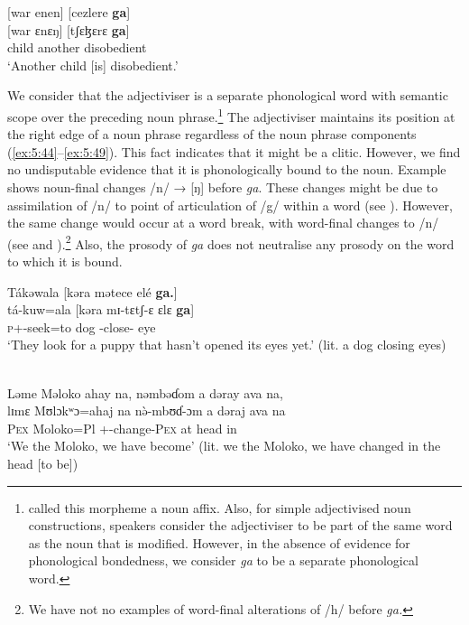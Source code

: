 \ea \label{ex:5:43}
{}[war  enen]  [cezlere  \textbf{ga}]\\
\gll  {}[war  ɛnɛŋ]   [tʃɛɮɛrɛ    \textbf{ga}]\\
      child    another    disobedient    {\ADJ}\\
\glt  ‘Another child [is] disobedient.’
\z

\largerpage
We consider that the adjectiviser is a separate phonological word with semantic scope over the preceding noun phrase.\footnote{\citet{Bow1997c} called this morpheme a noun affix. Also, for simple adjectivised noun constructions, speakers consider the adjectiviser to be part of the same word as the noun that is modified. However, in the absence of evidence for phonological bondedness, we consider \textit{ga} to be a separate phonological word.} The adjectiviser maintains its position at the right edge of a noun phrase regardless of the noun phrase components (\ref{ex:5:44}--\ref{ex:5:49}).  This fact indicates that it might be a clitic. However, we find no undisputable evidence that it is phonologically bound to the noun. Example  shows noun-final changes /n/ → [ŋ] before \textit{ga}. These changes might be due to assimilation of /n/ to point of articulation of /g/ within a word (see ). However, the same change would occur at a word break, with word-final changes to /n/ (see  and ).\footnote{We have not no examples of word-final alterations of /h/ before \textit{ga.}} Also, the prosody of \textit{ga} does not neutralise any prosody on the word to which it is bound. 

\ea \label{ex:5:44}
Tákəwala  [kəra  mətece  elé  \textbf{ga.}]\\
\gll  tá-kuw=ala    [kəra  mɪ-tɛtʃ-ɛ    ɛlɛ  \textbf{ga}]\\
      \textsc{p}+{\IFV}-seek=to  dog  {\NOM}{}-close-{\CL}  eye  {\ADJ}\\
\glt  ‘They look for a puppy that hasn’t opened its eyes yet.’ (lit. a dog closing eyes)
\z

\ea \label{ex:5:45}\\
Ləme  Məloko  ahay  na,  nəmbəɗom  a  dəray  ava  na,\\
\gll  lɪmɛ    Mʊlɔkʷɔ=ahaj    na   n\`{ə}-mbʊɗ{}-ɔm        a  dəraj  ava  na \\
      \textsc{Pex}   Moloko=Pl  {\PSP}  {\oneS}+{\PFV}-change-\textsc{Pex}  at   head  in    {\PSP}\\
\glt ‘We the Moloko, we have become’ (lit. we the Moloko, we have changed in the head [to be])
      
